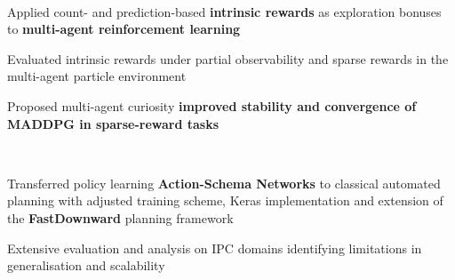 \documentclass[]{lukas-cv-openfont}
\begin{document}

\noindent
{}
\\
\begin{tightitemize}{1.7em}
    \item Applied count- and prediction-based \textbf{intrinsic rewards} as exploration bonuses to \textbf{multi-agent reinforcement learning}
    \item Evaluated intrinsic rewards under partial observability and sparse rewards in the multi-agent particle environment
    \item Proposed multi-agent curiosity \textbf{improved stability and convergence of MADDPG in sparse-reward tasks}
\end{tightitemize}
\largesectionsep


\noindent
{}
\\
\begin{tightitemize}{1.7em}
    \item Transferred policy learning \textbf{Action-Schema Networks} to classical automated planning with adjusted training scheme, Keras implementation and extension of the \textbf{FastDownward} planning framework
    \item Extensive evaluation and analysis on IPC domains identifying limitations in generalisation and scalability
\end{tightitemize}
\largesectionsep
\end{document}

